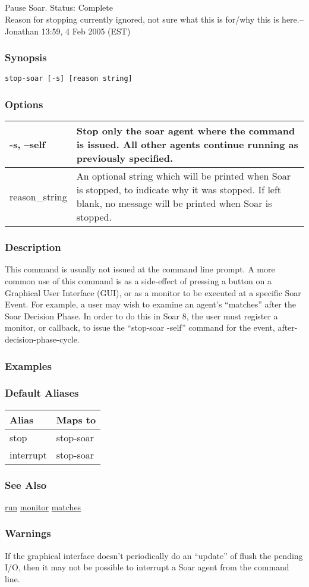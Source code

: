 \subsection{}
\label{stop-soar}
Pause Soar. 
 Status: Complete\\ 
Reason for stopping currently ignored, not sure what this is for/why this is here.--Jonathan 13:59, 4 Feb 2005 (EST) 
\subsubsection*{Synopsis}
\begin{verbatim}
stop-soar [-s] [reason string]
\end{verbatim}
\subsubsection*{Options}
\begin{tabular}{|l|l|}
\hline 
 -s, --self  & Stop only the soar agent where the command is issued. All other agents continue running as previously specified.  \\
 \hline 
 reason\_string  & An optional string which will be printed when Soar is stopped, to indicate why it was stopped. If left blank, no message will be printed when Soar is stopped.  \\
 \hline 
\end{tabular}
\subsubsection*{Description}
 This command is usually not issued at the command line prompt. A more common use of this command is as a side-effect of pressing a button on a Graphical User Interface (GUI), or as a monitor to be executed at a specific Soar Event. For example, a user may wish to examine an agent's ``matches'' after the Soar Decision Phase. In order to do this in Soar 8, the user must register a monitor, or callback, to issue the ``stop-soar -self'' command for the event, after-decision-phase-cycle. 
\subsubsection*{Examples}
\subsubsection*{Default Aliases}
\begin{tabular}{|l|l|}
\hline 
 Alias  & Maps to  \\
 \hline 
 stop  & stop-soar  \\
 \hline 
 interrupt  & stop-soar  \\
 \hline 
\end{tabular}
\subsubsection*{See Also}
\hyperref[run]{run} \hyperref[monitor]{monitor} \hyperref[matches]{matches} \subsubsection*{Warnings}
 If the graphical interface doesn't periodically do an ``update'' of flush the pending I/O, then it may not be possible to interrupt a Soar agent from the command line. 
